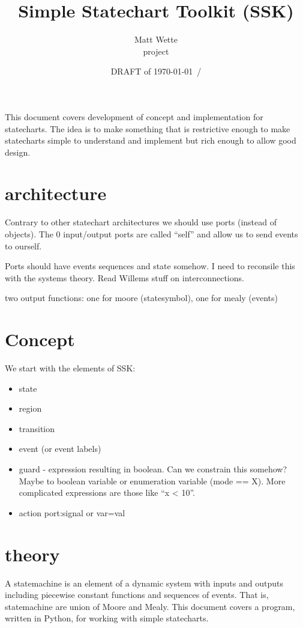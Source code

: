 \documentclass{article}
\title{%
Simple Statechart Toolkit (SSK)
}
\author{Matt Wette \\ project }
\date{\large DRAFT of \noindent\today \ /\the\time}
\begin{document}
\maketitle

This document covers development of concept and implementation for 
statecharts.  The idea is to make something that is restrictive enough
to make statecharts simple to understand and implement but rich enough
to allow good design.

\section{architecture}

Contrary to other statechart architectures we should use ports (instead of
objects).  The 0 input/output ports are called ``self'' and allow us to 
send events to ourself.

Ports should have events sequences and state somehow.  I need to reconsile
this with the systems theory. Read Willems stuff on interconnections.

two output functions: one for moore (statesymbol), one for mealy (events)

\section{Concept}

We start with the elements of SSK:
\begin{itemize}
\item
state
\item
region
\item
transition
\item
event (or event labels)
\item
guard - expression resulting in boolean.  Can we constrain this
somehow?  Maybe to boolean variable or enumeration variable (mode ==
X).  More complicated expressions are those like ``x < 10''.
\item
action port:signal or var=val
\end{itemize}


\section{theory}

A statemachine is an element of a dynamic system with inputs and outputs 
including piecewise constant functions and sequences of events.  That is,
statemachine are union of Moore and Mealy.
This document covers a program, written in Python, for working
with simple statecharts.
\end{document}
